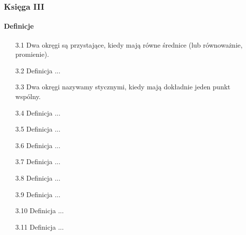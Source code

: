 %

\subsubsection{Księga III}
\paragraph{Definicje}
\begin{enumerate}
    \item [3.1] Dwa okręgi są przystające, kiedy mają równe średnice (lub równoważnie, promienie).
    \item [3.2] Definicja ...
    \item [3.3] Dwa okręgi nazywamy stycznymi, kiedy mają dokładnie jeden punkt wspólny.
    \item [3.4] Definicja ...
    \item [3.5] Definicja ...
    \item [3.6] Definicja ...
    \item [3.7] Definicja ...
    \item [3.8] Definicja ...
    \item [3.9] Definicja ...
    \item [3.10] Definicja ...
    \item [3.11] Definicja ...
\end{enumerate}


